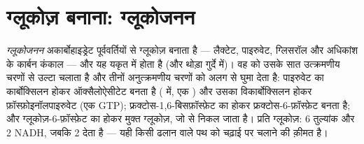 \section{ग्लूकोज़ बनाना: ग्लूकोजनन}

\begin{definition}[ग्लूकोजनन]\label{def:b1:biosyntheses-integration:gluconeogenesis}
\emph{ग्लूकोजनन} अकार्बोहाइड्रेट पूर्ववर्तियों से ग्लूकोज़ बनाता है
--- लैक्टेट, पाइरुवेट, ग्लिसरॉल और अधिकांश  के कार्बन कंकाल
--- और यह यकृत में होता है (और थोड़ा गुर्दे में)। वह  को
उसके सात उत्क्रमणीय चरणों से उल्टा चलाता है और तीनों अनुत्क्रमणीय चरणों को
अलग  से घुमा देता है: पाइरुवेट का कार्बोक्सिलन होकर
ऑक्सैलोऐसीटेट बनता है ( में, एक ) और उसका विकार्बोक्सिलन होकर
फ़ॉस्फ़ोइनॉलपाइरुवेट (एक GTP); फ्रक्टोस-1,6-बिसफ़ॉस्फ़ेट का  होकर
फ्रक्टोस-6-फ़ॉस्फ़ेट बनता है; और ग्लूकोज़-6-फ़ॉस्फ़ेट का  होकर
मुक्त ग्लूकोज़, जो  से निकल जाता है। प्रति ग्लूकोज़: 6 
तुल्यांक और 2 NADH, जबकि  2  देता है --- यही किसी ढलान
वाले पथ को चढ़ाई पर चलाने की क़ीमत है।
\end{definition}

